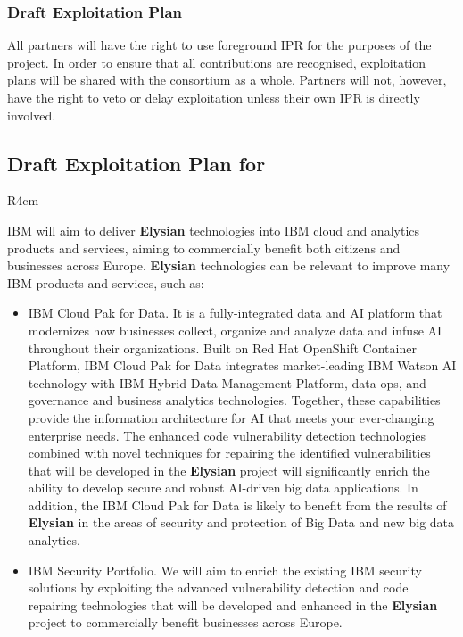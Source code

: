 \documentclass[a4paper,11pt]{article}
\newcommand{\project}[1]{\textbf{#1}\xspace}
\newcommand{\SECURITY}{\project{Elysian}}
\newcommand{\TheProject}{\SECURITY}
\begin{document}
\subsubsection{Draft Exploitation Plan}
\label{sect:exploitation-plan}
\vspace{-12pt}

All partners will have the right to use foreground IPR for
the purposes of the project. In order to ensure that all
contributions are recognised, exploitation plans will be
shared with the consortium as a whole. Partners will not,
however, have the right to veto or delay exploitation
unless their own IPR is directly involved.


\horizontalline

\subsection*{Draft Exploitation Plan for \IBMshort{}}

\begin{wrapfigure}{R}{4cm}
\vspace{-1.4cm}
\hfill {}
\vspace{-0.6cm}
\end{wrapfigure}

IBM will aim to deliver \TheProject technologies into IBM cloud and analytics products and services, aiming to commercially benefit both citizens and businesses across Europe. \TheProject technologies can be relevant to improve many IBM products and services, such as:
\begin{itemize}
    \item IBM Cloud Pak for Data. It is a fully-integrated data and AI platform that modernizes how businesses collect, organize and analyze data and infuse AI throughout their organizations. Built on Red Hat OpenShift Container Platform, IBM Cloud Pak for Data integrates market-leading IBM Watson AI technology with IBM Hybrid Data Management Platform, data ops, and governance and business analytics technologies. Together, these capabilities provide the information architecture for AI that meets your ever-changing enterprise needs. The enhanced code vulnerability detection technologies combined with novel techniques for repairing the identified vulnerabilities that will be developed in the \TheProject project will significantly enrich the ability to develop secure and robust AI-driven big data applications. In addition, the IBM Cloud Pak for Data is likely to benefit from the results of \TheProject in the areas of security and protection of Big Data and new big data analytics.
    \item IBM Security Portfolio. We will aim to enrich the existing IBM security solutions by exploiting the advanced vulnerability detection and code repairing technologies that will be developed and enhanced in the \TheProject project to commercially benefit businesses across Europe.
\end{itemize}
\end{document}
